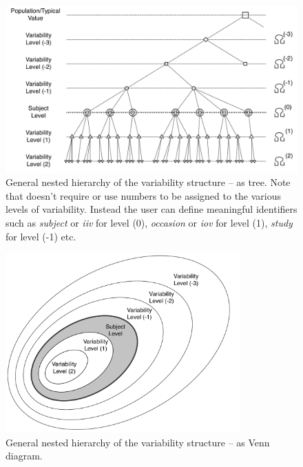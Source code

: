 \begin{figure}[htb!]
\centering
  \includegraphics[width=130mm]{pics/IOV-general-TREE}
 \caption{General nested hierarchy of the variability structure -- as tree. Note that 
 \pharmml doesn't require or use numbers to be assigned to the various levels of 
 variability. Instead the user can define meaningful identifiers such as \emph{subject}
  or \emph{iiv} for level (0), \emph{occasion} or \emph{iov} for level (1), \emph{study} for level (-1) etc.}
 \label{IOVgeneral_tree}
\end{figure}

\begin{figure}[htb!]
\centering
  \includegraphics[width=90mm]{pics/IOV-general-VENN}
 \caption{General nested hierarchy of the variability structure -- as Venn diagram.}
 \label{IOVgeneral_venn}
\end{figure}


